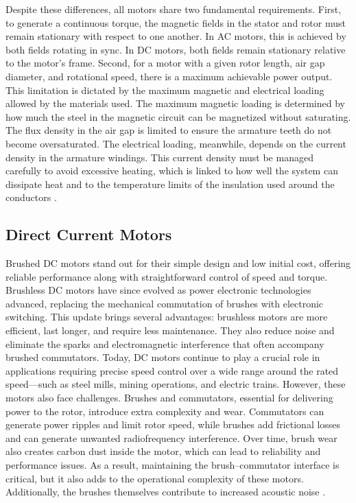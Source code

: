 Despite these differences, all motors share two fundamental requirements. First, to generate a continuous torque, the magnetic fields in the stator and rotor must remain stationary with respect to one another. In AC motors, this is achieved by both fields rotating in sync. In DC motors, both fields remain stationary relative to the motor’s frame. Second, for a motor with a given rotor length, air gap diameter, and rotational speed, there is a maximum achievable power output. This limitation is dictated by the maximum magnetic and electrical loading allowed by the materials used. The maximum magnetic loading is determined by how much the steel in the magnetic circuit can be magnetized without saturating. The flux density in the air gap is limited to ensure the armature teeth do not become oversaturated. The electrical loading, meanwhile, depends on the current density in the armature windings. This current density must be managed carefully to avoid excessive heating, which is linked to how well the system can dissipate heat and to the temperature limits of the insulation used around the conductors \cite[see][26]{Toliyat:2004}.

\subsection{Direct Current Motors}
Brushed DC motors stand out for their simple design and low initial cost, offering reliable performance along with straightforward control of speed and torque. Brushless DC motors have since evolved as power electronic technologies advanced, replacing the mechanical commutation of brushes with electronic switching. This update brings several advantages: brushless motors are more efficient, last longer, and require less maintenance. They also reduce noise and eliminate the sparks and electromagnetic interference that often accompany brushed commutators. Today, DC motors continue to play a crucial role in applications requiring precise speed control over a wide range around the rated speed—such as steel mills, mining operations, and electric trains. However, these motors also face challenges. Brushes and commutators, essential for delivering power to the rotor, introduce extra complexity and wear. Commutators can generate power ripples and limit rotor speed, while brushes add frictional losses and can generate unwanted radiofrequency interference. Over time, brush wear also creates carbon dust inside the motor, which can lead to reliability and performance issues. As a result, maintaining the brush–commutator interface is critical, but it also adds to the operational complexity of these motors. Additionally, the brushes themselves contribute to increased acoustic noise \cite[see][39]{Tong:2014}. 


